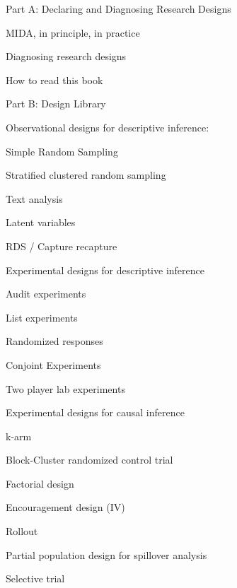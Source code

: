 \documentclass[11pt]{article}
\begin{document}
\begin{legal}
\item {Part A: Declaring and Diagnosing Research Designs}

	\begin{legal}
	\item  MIDA, in principle, in practice
	\item  Diagnosing research designs
	\item  How to read this book
	\end{legal}

\item Part B: Design Library

	\begin{legal}
	\item Observational designs for descriptive inference: 
	
		\begin{legal}
		\item Simple Random Sampling
		\item Stratified clustered  random sampling
		\item Text analysis
		\item Latent variables
		\item RDS / Capture recapture
		\end{legal}
	
	\item Experimental designs for descriptive inference
	
		\begin{legal}
		\item 	Audit experiments
		\item 	List experiments
		\item 	Randomized responses
		\item 	Conjoint Experiments
		\item 	Two player lab experiments
		\end{legal}
	
	\item Experimental designs for causal inference
	
		\begin{legal}
		\item 	k-arm
		\item 	Block-Cluster randomized control trial
		\item 	Factorial design
		\item 	Encouragement design (IV)
		\item 	Rollout
		\item 	Partial population design for spillover analysis
		\item 	Selective trial
		\end{legal}


\end{legal}
\end{legal}
\end{document}
